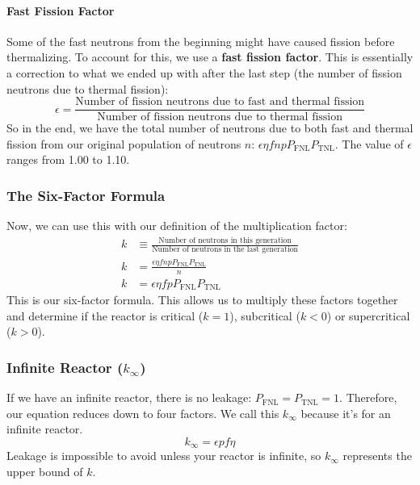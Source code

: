 \documentclass[letter]{article}
\begin{document}
\paragraph{Fast Fission Factor}

Some of the fast neutrons from the beginning might have caused fission
before thermalizing. To account for this, we use a \textbf{fast
  fission factor}. This is essentially a correction to what we ended
up with after the last step (the number of fission neutrons due to
thermal fission):
\begin{equation*}
  \epsilon = \frac{\text{Number of fission neutrons due to fast and
      thermal fission}}{\text{Number of fission neutrons due to
      thermal fission}}
\end{equation*}
So in the end, we have the total number of neutrons due to both fast
and thermal fission from our original population of neutrons $n$:
$\epsilon\eta{}fnpP_{\text{FNL}}P_{\text{TNL}}$. The value of
$\epsilon$ ranges from 1.00 to 1.10.

\subsubsection{The Six-Factor Formula}
Now, we can use this with our definition of the multiplication factor:
\begin{equation*}
  \begin{split}
    k&\equiv\frac{\text{Number of neutrons in this
        generation}}{\text{Number of neutrons in the last generation}}
    \\
    k&=\frac{\epsilon\eta{}fnpP_{\text{FNL}}P_{\text{TNL}}}{n}\\
    k&=\epsilon\eta{}fpP_{\text{FNL}}P_{\text{TNL}}
  \end{split}\end{equation*}
This is our six-factor formula. This allows us to multiply these
factors together and determine if the reactor is critical ($k=1$),
subcritical ($k<0$) or supercritical ($k>0$).

\subsubsection{Infinite Reactor ($k_\infty$)}

If we have an infinite reactor, there is no leakage:
$P_{\text{FNL}}=P_{\text{TNL}}=1$. Therefore, our equation reduces
down to four factors. We call this $k_\infty$ because it's for an
infinite reactor.\cite[Lec. 10]{lecture}
\begin{equation*}
  k_\infty=\epsilon{}pf\eta
\end{equation*}
Leakage is impossible to avoid unless your reactor is infinite, so
$k_\infty$ represents the upper bound of $k$.\cite[Lec. 10]{lecture}
\end{document}
